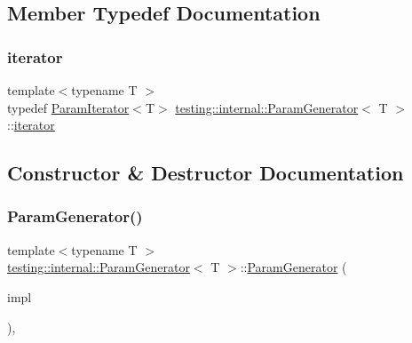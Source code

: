 \subsection{Member Typedef Documentation}
\mbox{\label{classtesting_1_1internal_1_1ParamGenerator_a448b08a8eaae1f1d27840d4dbd66c357}} 
\subsubsection{\texorpdfstring{iterator}{iterator}}
{\footnotesize\ttfamily template$<$typename T $>$ \\
typedef \mbox{\hyperlink{classtesting_1_1internal_1_1ParamIterator}{Param\+Iterator}}$<$T$>$ \mbox{\hyperlink{classtesting_1_1internal_1_1ParamGenerator}{testing\+::internal\+::\+Param\+Generator}}$<$ T $>$\+::\mbox{\hyperlink{classtesting_1_1internal_1_1ParamGenerator_a448b08a8eaae1f1d27840d4dbd66c357}{iterator}}}



\subsection{Constructor \& Destructor Documentation}
\mbox{\label{classtesting_1_1internal_1_1ParamGenerator_a6b017d4d030927714d495ee95ae92fbc}} 
\subsubsection{\texorpdfstring{ParamGenerator()}{ParamGenerator()}\hspace{0.1cm}{\footnotesize\ttfamily [1/2]}}
{\footnotesize\ttfamily template$<$typename T $>$ \\
\mbox{\hyperlink{classtesting_1_1internal_1_1ParamGenerator}{testing\+::internal\+::\+Param\+Generator}}$<$ T $>$\+::\mbox{\hyperlink{classtesting_1_1internal_1_1ParamGenerator}{Param\+Generator}} (\begin{DoxyParamCaption}\item[{\mbox{\hyperlink{classtesting_1_1internal_1_1ParamGeneratorInterface}{Param\+Generator\+Interface}}$<$ T $>$ $\ast$}]{impl }\end{DoxyParamCaption})\hspace{0.3cm}{\ttfamily [inline]}, {\ttfamily [explicit]}}

